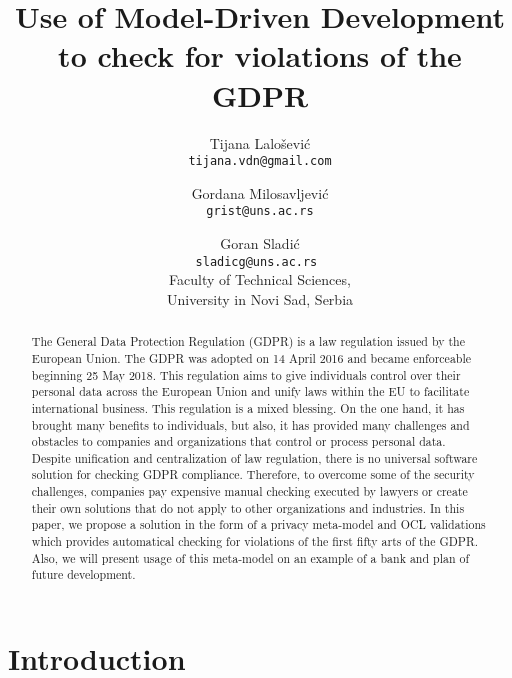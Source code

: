 \documentclass[11pt,english]{article}
\begin{document}
\title{Use of Model-Driven Development to check for violations of the GDPR}
\author{
  Tijana Lalošević\\
  \texttt{tijana.vdn@gmail.com}
  \and
  Gordana Milosavljević\\
  \texttt{grist@uns.ac.rs}
  \and
  Goran Sladić\\
  \texttt{sladicg@uns.ac.rs }
  \\Faculty of Technical Sciences,\\ University in Novi Sad, Serbia
}


\date{}
\maketitle


\begin{abstract}
The General Data Protection Regulation (GDPR) is a law regulation issued by the European Union. The GDPR was adopted on 14 April 2016 and became enforceable beginning 25 May 2018.  This regulation aims to give individuals control over their personal data across the European Union and unify laws within the EU to facilitate international business. This regulation is a mixed blessing. On the one hand, it has brought many benefits to individuals, but also, it has provided many challenges and obstacles to companies and organizations that control or process personal data. Despite unification and centralization of law regulation, there is no universal software solution for checking GDPR compliance. Therefore, to overcome some of the security challenges, companies pay expensive manual checking executed by lawyers or create their own solutions that do not apply to other organizations and industries. In this paper, we propose a solution in the form of a privacy meta-model and OCL validations which provides automatical checking for violations of the first fifty arts of the GDPR. Also, we will present usage of this meta-model on an example of a bank and plan of future development.
\end{abstract}

\section{Introduction}
\end{document}
